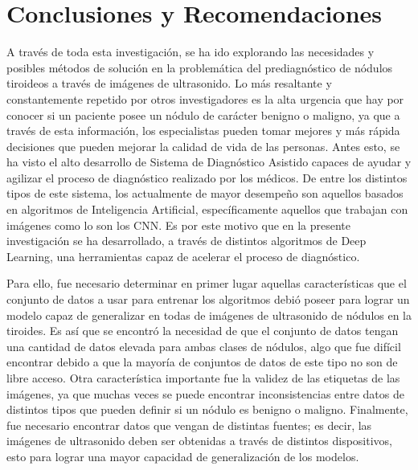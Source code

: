 \chapter{Conclusiones y Recomendaciones}

A través de toda esta investigación, se ha ido explorando las necesidades y posibles métodos de solución en la problemática del prediagnóstico de nódulos tiroideos a través de imágenes de ultrasonido. Lo más resaltante y constantemente repetido por otros investigadores es la alta urgencia que hay por conocer si un paciente posee un nódulo de carácter benigno o maligno, ya que a través de esta información, los especialistas pueden tomar mejores y más rápida decisiones que pueden mejorar la calidad de vida de las personas. Antes esto, se ha visto el alto desarrollo de Sistema de Diagnóstico Asistido capaces de ayudar y agilizar el proceso de diagnóstico realizado por los médicos. De entre los distintos tipos de este sistema, los actualmente de mayor desempeño son aquellos basados en algoritmos de Inteligencia Artificial, específicamente aquellos que trabajan con imágenes como lo son los CNN. Es por este motivo que en la presente investigación se ha desarrollado, a través de distintos algoritmos de Deep Learning, una herramientas capaz de acelerar el proceso de diagnóstico. 

Para ello, fue necesario determinar en primer lugar aquellas características que el conjunto de datos a usar para entrenar los algoritmos debió poseer para lograr un modelo capaz de generalizar en todas de imágenes de ultrasonido de nódulos en la tiroides. Es así que se encontró la necesidad de que el conjunto de datos tengan una cantidad de datos elevada para ambas clases de nódulos, algo que fue difícil encontrar debido a que la mayoría de conjuntos de datos de este tipo no son de libre acceso. Otra característica importante fue la validez de las etiquetas de las imágenes, ya que muchas veces se puede encontrar inconsistencias entre datos de distintos tipos que pueden definir si un nódulo es benigno o maligno. Finalmente, fue necesario encontrar datos que vengan de distintas fuentes; es decir, las imágenes de ultrasonido deben ser obtenidas a través de distintos dispositivos, esto para lograr una mayor capacidad de generalización de los modelos.

